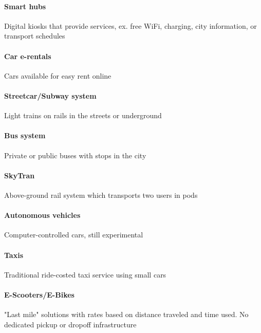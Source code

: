 \documentclass[12pt]{article}                       %
\begin{document}
\paragraph{Smart hubs} Digital kiosks that provide services, ex. free WiFi, charging, city information, or transport schedules

\paragraph{Car e-rentals} Cars available for easy rent online

\paragraph{Streetcar/Subway system} Light trains on rails in the streets or underground

\paragraph{Bus system} Private or public buses with stops in the city

\paragraph{SkyTran} Above-ground rail system which transports two users in pods

\paragraph{Autonomous vehicles} Computer-controlled cars, still experimental

\paragraph{Taxis} Traditional ride-costed taxi service using small cars

\paragraph{E-Scooters/E-Bikes} "Last mile" solutions with rates based on distance traveled and time used. No dedicated pickup or dropoff infrastructure

\end{document}
